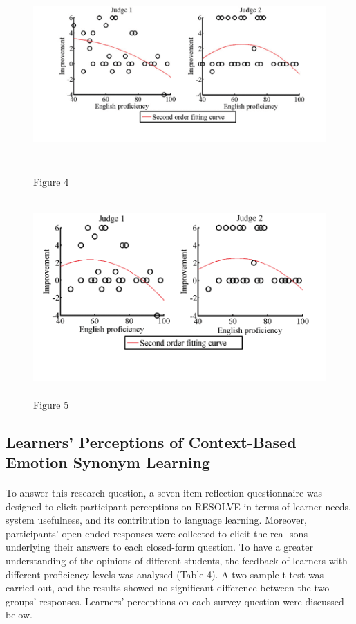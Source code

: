 \documentclass[a4paper,12pt,oneside]{article}
\begin{document}
\begin{figure}[H]
\includegraphics[height=7.5cm,width=16cm]{Figure4.png}
\centering
\caption{Figure 4}
\end{figure}


\begin{figure}[H]
\includegraphics[height=7.5cm,width=16cm]{Figure5.png}
\centering
\caption{Figure 5}
\end{figure}

\subsection{Learners’ Perceptions of Context-Based Emotion Synonym Learning}
\paragraph{}
To answer this research question, a seven-item reflection questionnaire was designed to elicit participant perceptions on RESOLVE in terms of learner needs, system usefulness, and its contribution to language learning. Moreover, participants’ open-ended responses were collected to elicit the rea- sons underlying their answers to each closed-form question. To have a greater understanding of the opinions of different students, the feedback of learners with different proficiency levels was analysed (Table 4). A two-sample t test was carried out, and the results showed no significant difference between the two groups’ responses. Learners’ perceptions on each survey question were discussed below. 
\end{document}
